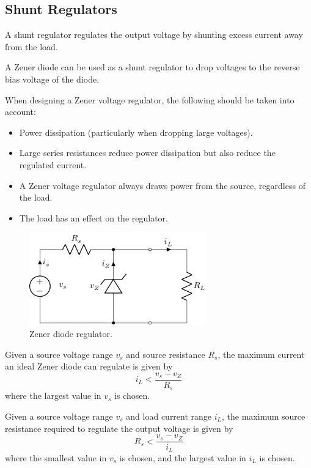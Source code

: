 \documentclass{article}
\begin{document}
\subsection{Shunt Regulators}
\begin{definition}
    A shunt regulator regulates the output voltage by shunting excess current away from the load.
\end{definition}
A Zener diode can be used as a shunt regulator to drop voltages to the reverse bias voltage of the diode.
\begin{remark}
    When designing a Zener voltage regulator, the following should be taken into account:
    \begin{itemize}
        \item Power dissipation (particularly when dropping large
              voltages).
        \item Large series resistances reduce power dissipation but
              also reduce the regulated current.
        \item A Zener voltage regulator always draws power from the
              source, regardless of the load.
        \item The load has an effect on the regulator.
    \end{itemize}
\end{remark}
\begin{figure}[H]
    \centering
    \includegraphics[height = 4cm, keepaspectratio = true]{figures/zener_regulator.pdf}
    \caption{Zener diode regulator.}
\end{figure}
\begin{theorem}
    Given a source voltage range \(v_s\) and source resistance \(R_s\), the maximum current an ideal
    Zener diode can regulate is given by
    \begin{equation*}
        i_L < \frac{v_s - v_Z}{R_s}
    \end{equation*}
    where the largest value in \(v_s\) is chosen.
\end{theorem}
\begin{theorem}
    Given a source voltage range \(v_s\) and load current range \(i_L\), the maximum source resistance required
    to regulate the output voltage is given by
    \begin{equation*}
        R_s < \frac{v_s - v_Z}{i_L}
    \end{equation*}
    where the smallest value in \(v_s\) is chosen, and the largest value in \(i_L\) is chosen.
\end{theorem}
\end{document}
